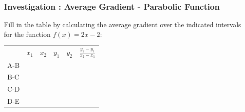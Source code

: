             \subsubsection{  Investigation : Average Gradient - Parabolic Function }
            \nopagebreak
      \label{m39223*id190208}Fill in the table by calculating the average gradient over the indicated
intervals for the function $f\left(x\right)=2x-2$:\par 
          \begin{table}[H]
        \begin{center}
      \label{m39223*id190240}
    \noindent
      \tablelasttail{}
      \begin{xtabular}[t]{|l|l|l|l|l|l|}\hline
         &
                ${x}_{1}$
               &
                ${x}_{2}$
               &
                ${y}_{1}$
               &
                ${y}_{2}$
               &
                $\frac{{y}_{2}-{y}_{1}}{{x}_{2}-{x}_{1}}$
     \tabularnewline{}
        A-B &
         &
         &
         &
         &
     \tabularnewline{}
        B-C &
         &
         &
         &
         &
     \tabularnewline{}
        C-D &
         &
         &
         &
         &
     \tabularnewline{}
        D-E &
         &
         &
         &
         &
     \tabularnewline{}

\end{xtabular}
\end{center}
\end{table}
